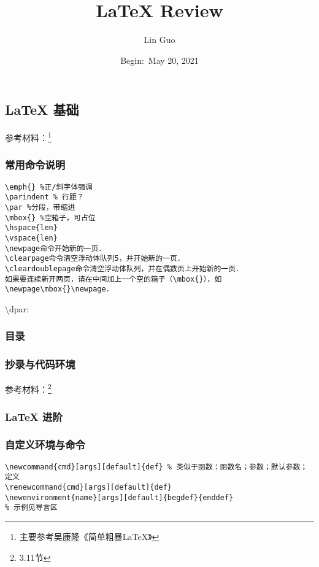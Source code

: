\documentclass{report}
\title{\LaTeX{} Review}
\author{Lin Guo}
\date{Begin:\ May 20, 2021}
\begin{document}
\maketitle
\tableofcontents

\part{\LaTeXe}

\chapter{\LaTeX{} 基础}

参考材料：\footnote{主要参考吴康隆《简单粗暴\LaTeX》}

\section{常用命令说明}


\begin{verbatim}
\emph{} %正/斜字体强调
\parindent % 行距？
\par %分段，带缩进
\mbox{} %空箱子，可占位
\hspace{len}
\vspace{len}
\newpage命令开始新的一页．
\clearpage命令清空浮动体队列5，并开始新的一页．
\cleardoublepage命令清空浮动体队列，并在偶数页上开始新的一页．
如果要连续新开两页，请在中间加上一个空的箱子（\mbox{}），如\newpage\mbox{}\newpage．

\end{verbatim}
\textbackslash dpar:

\section{目录}


\section{抄录与代码环境}

参考材料：\footnote{3.11节}

\section{\LaTeX{} 进阶}

\section{自定义环境与命令}
\begin{verbatim}
\newcommand{cmd}[args][default]{def} % 类似于函数：函数名；参数；默认参数；定义
\renewcommand{cmd}[args][default]{def}
\newenvironment{name}[args][default]{begdef}{enddef}
% 示例见导言区
\end{verbatim}
\end{document}
